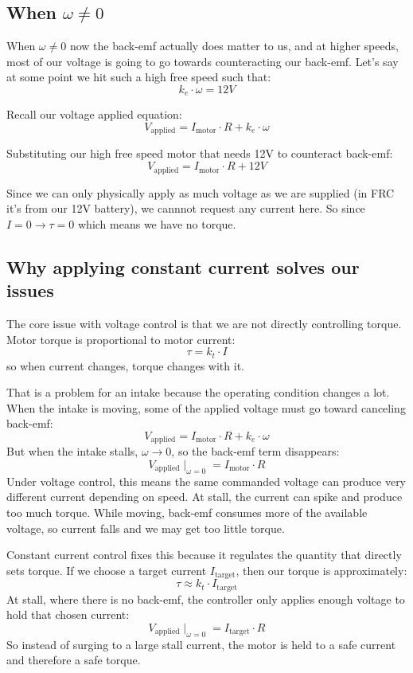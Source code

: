 \documentclass[12pt]{article}
\begin{document}
\subsection{When $\omega \neq 0$}
When $\omega \neq 0$ now the back-emf actually does matter to us, and at higher speeds, most of our voltage is going to go towards counteracting our back-emf. Let's say at some point we hit such a high free speed such that:
$$
k_e \cdot \omega = 12V
$$

Recall our voltage applied equation:
$$
V_{\text{applied}} = I_{\text{motor}} \cdot R + k_e \cdot \omega
$$

Substituting our high free speed motor that needs 12V to counteract back-emf:
$$
V_{\text{applied}} = I_{\text{motor}} \cdot R + 12V
$$

Since we can only physically apply as much voltage as we are supplied (in FRC it's from our 12V battery), we cannnot request any current here. So since $I = 0 \rightarrow \tau = 0$ which means we have no torque.

\subsection{Why applying constant current solves our issues}
The core issue with voltage control is that we are not directly controlling torque. Motor torque is proportional to motor current:
\[
\tau = k_t \cdot I
\]
so when current changes, torque changes with it.

\par That is a problem for an intake because the operating condition changes a lot. When the intake is moving, some of the applied voltage must go toward canceling back-emf:
\[
V_{\text{applied}} = I_{\text{motor}} \cdot R + k_e \cdot \omega
\]
But when the intake stalls, $\omega \to 0$, so the back-emf term disappears:
\[
V_{\text{applied}} \mid_{\omega = 0} = I_{\text{motor}} \cdot R
\]
Under voltage control, this means the same commanded voltage can produce very different current depending on speed. At stall, the current can spike and produce too much torque. While moving, back-emf consumes more of the available voltage, so current falls and we may get too little torque.

\par Constant current control fixes this because it regulates the quantity that directly sets torque. If we choose a target current $I_{\text{target}}$, then our torque is approximately:
\[
\tau \approx k_t \cdot I_{\text{target}}
\]
At stall, where there is no back-emf, the controller only applies enough voltage to hold that chosen current:
\[
V_{\text{applied}} \mid_{\omega = 0} = I_{\text{target}} \cdot R
\]
So instead of surging to a large stall current, the motor is held to a safe current and therefore a safe torque.
\end{document}
